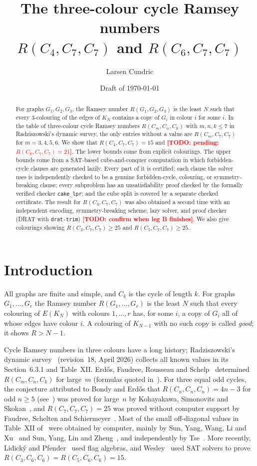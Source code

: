 \documentclass[11pt]{amsart}
\title[The cycle Ramsey numbers $R(C_4,C_7,C_7)$ and $R(C_6,C_7,C_7)$]{The three-colour cycle Ramsey numbers\\ $R(C_4,C_7,C_7)$ and $R(C_6,C_7,C_7)$}
\author{Larsen Cundric}
\date{Draft of \today}
\newcommand{\TODO}[1]{\textcolor{red}{\textbf{[TODO: #1]}}}
\theoremstyle{definition}
\theoremstyle{remark}
\begin{document}
\begin{abstract}
For graphs $G_1,G_2,G_3$, the Ramsey number $R(G_1,G_2,G_3)$ is the least $N$ such that every $3$-colouring of the edges of
$K_N$ contains a copy of $G_i$ in colour $i$ for some $i$. In the table of three-colour cycle Ramsey numbers
$R(C_m,C_n,C_k)$ with $m,n,k\le 7$ in Radziszowski's dynamic survey, the only entries without a value are
$R(C_m,C_7,C_7)$ for $m=3,4,5,6$. We show that $R(C_4,C_7,C_7)=15$ and \TODO{pending: $R(C_6,C_7,C_7)=21$}.
The lower bounds come from explicit colourings. The upper bounds come from a SAT-based cube-and-conquer
computation in which forbidden-cycle clauses are generated lazily. Every part of it is certified: each clause the solver uses
is independently checked to be a genuine forbidden-cycle, colouring, or symmetry-breaking clause; every subproblem has an
unsatisfiability proof checked by the formally verified checker \texttt{cake\_lpr}; and the cube split is covered by a separate
checked certificate. The result for $R(C_4,C_7,C_7)$ was also obtained a second time with an independent encoding, symmetry-breaking
scheme, lazy solver, and proof checker (DRAT with \texttt{drat-trim}) \TODO{confirm when leg B finishes}. We also give
colourings showing $R(C_3,C_7,C_7)\ge 25$ and $R(C_5,C_7,C_7)\ge 25$.
\end{abstract}

\maketitle

\section{Introduction}

All graphs are finite and simple, and $C_k$ is the cycle of length $k$. For graphs $G_1,\dots,G_r$ the Ramsey number
$R(G_1,\dots,G_r)$ is the least $N$ such that every colouring of $E(K_N)$ with colours $1,\dots,r$ has, for some $i$, a copy of
$G_i$ all of whose edges have colour $i$. A colouring of $K_{N-1}$ with no such copy is called \emph{good}; it shows $R>N-1$.

Cycle Ramsey numbers in three colours have a long history; Radziszowski's dynamic survey~\cite{Rad} (revision~18, April 2026)
collects all known values in its Section~6.3.1 and Table~XII. Erd\H{o}s, Faudree, Rousseau and Schelp~\cite{EFRS1} determined
$R(C_m,C_n,C_k)$ for large~$m$ (formulas quoted in~\cite[6.3.1(a)]{Rad}). For three equal odd cycles, the conjecture attributed to
Bondy and Erd\H{o}s that $R(C_n,C_n,C_n)=4n-3$ for odd $n\ge5$ (see~\cite[6.3.1]{Rad}) was proved for large~$n$ by
Kohayakawa, Simonovits and Skokan~\cite{KoSS2}, and $R(C_7,C_7,C_7)=25$ was proved without computer support by Faudree, Schelten and
Schiermeyer~\cite{FSS3}. Most of the small off-diagonal values in Table~XII of~\cite{Rad} were obtained by computer, mainly by Sun,
Yang, Wang, Li and Xu~\cite{SunYWLX} and Sun, Yang, Lin and Zheng~\cite{SunYLZ2}, and independently by Tse~\cite{Tse3}. More
recently, Lidick\'y and Pfender~\cite{LidP} used flag algebras, and Wesley~\cite{We3} used SAT solvers to prove
$R(C_3,C_6,C_6)=R(C_5,C_6,C_6)=15$.
\end{document}
